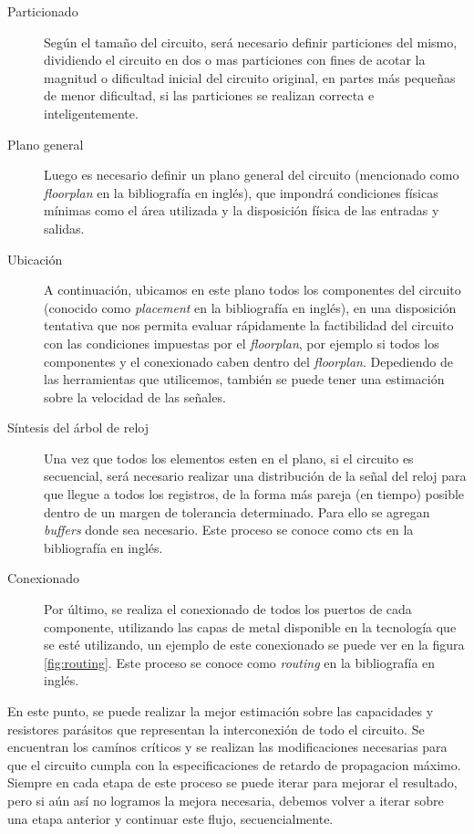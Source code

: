\begin{description}
\item[Particionado]
Según el tamaño del circuito, será necesario definir particiones del mismo, dividiendo el circuito en dos o mas particiones con fines de acotar la magnitud o dificultad inicial del circuito original, en partes más pequeñas de menor dificultad, si las particiones se realizan correcta e inteligentemente. 
\item[Plano general]
Luego es necesario definir un plano general del circuito (mencionado como \emph{floorplan} en la bibliografía en inglés), que impondrá condiciones físicas mínimas como el área utilizada y la disposición física de las entradas y salidas.
\item[Ubicación]
A continuación, ubicamos en este plano todos los componentes del circuito (conocido como \emph{placement} en la bibliografía en inglés), en una disposición tentativa que nos permita evaluar rápidamente la factibilidad del circuito con las condiciones impuestas por el \emph{floorplan}, por ejemplo si todos los componentes y el conexionado caben dentro del \emph{floorplan}. Depediendo de las herramientas que utilicemos, también se puede tener una estimación sobre la velocidad de las señales. 
\item[Síntesis del árbol de reloj]
Una vez que todos los elementos esten en el plano, si el circuito es secuencial, será necesario realizar una distribución de la señal del reloj para que llegue a todos los registros, de la forma más pareja (en tiempo) posible dentro de un margen de tolerancia determinado. Para ello se agregan \emph{buffers} donde sea necesario. Este proceso se conoce como \gls{cts} en la bibliografía en inglés.
\item[Conexionado]
Por último, se realiza el conexionado de todos los puertos de cada componente, utilizando las capas de metal disponible en la tecnología que se esté utilizando, un ejemplo de este conexionado se puede ver en la figura \ref{fig:routing}. Este proceso se conoce como \emph{routing} en la bibliografía en inglés.
\end{description}

En este punto, se puede realizar la mejor estimación sobre las capacidades y resistores parásitos que representan la interconexión de todo el circuito. Se encuentran los camínos críticos y se realizan las modificaciones necesarias para que el circuito cumpla con la especificaciones de retardo de propagacion máximo. Siempre en cada etapa de este proceso se puede iterar para mejorar el resultado, pero si aún así no logramos la mejora necesaria, debemos volver a iterar sobre una etapa anterior y continuar este flujo, secuencialmente.

